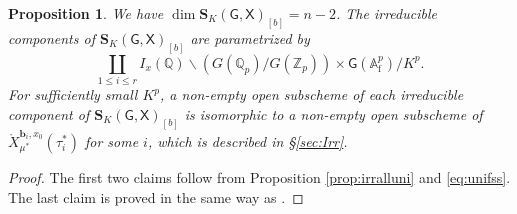 \documentclass[12pt,a4paper]{article}
\newtheorem{prop}[thm]{Proposition}
\newcommand{\bQ}{\mathbb{Q}}
\newcommand{\bZ}{\mathbb{Z}}
\newcommand{\bfS}{\mathbf{S}}
\newcommand{\bfb}{\mathbf{b}}
\newcommand{\sfG}{\mathsf{G}}
\newcommand{\sfX}{\mathsf{X}}
\newcommand{\Af}{\mathbb{A}_{\mathrm{f}}}
\begin{document}
\begin{prop}
We have $\dim \bfS_{K}(\sfG,\sfX)_{[b]}=n-2$. 
The irreducible components of 
$\bfS_{K}(\sfG,\sfX)_{[b]}$ are parametrized by 
\[
 \coprod_{1 \leq i \leq r} I_x(\bQ) \backslash (G(\bQ_p)/G(\bZ_p)) \times \sfG (\Af^p) 
 / K^p . 
\]
For sufficiently small $K^p$, a non-empty open subscheme of each irreducible component of $\bfS_{K}(\sfG,\sfX)_{[b]}$ is isomorphic to 
a non-empty open subscheme of $\mathring{X}_{\mu^*}^{\bfb_i,x_0}(\tau_i^*)$ 
for some $i$, which is described in \S \ref{sec:Irr}. 
\end{prop}
\begin{proof}
The first two claims follow from 
Proposition \ref{prop:irralluni} and \eqref{eq:unifss}. 
The last claim is proved in the same way as \cite[Theorem 6.1]{VolGUI}. 
\end{proof}
\end{document}
